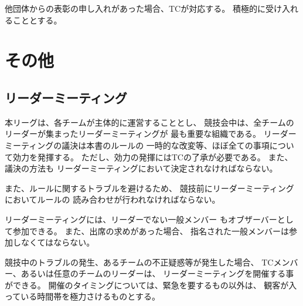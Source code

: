 \documentclass[a4j]{jarticle}
\begin{document}
他団体からの表彰の申し入れがあった場合、TCが対応する。
積極的に受け入れることとする。

\section{その他}

\subsection{リーダーミーティング}

本リーグは、各チームが主体的に運営することとし、
競技会中は、全チームのリーダーが集まったリーダーミーティングが
最も重要な組織である。
リーダーミーティングの議決は本書のルールの
一時的な改変等、ほぼ全ての事項について効力を発揮する。
ただし、効力の発揮にはTCの了承が必要である。
また、議決の方法も
リーダーミーティングにおいて決定されなければならない。

また、ルールに関するトラブルを避けるため、
競技前にリーダーミーティングにおいてルールの
読み合わせが行われなければならない。


リーダーミーティングには、リーダーでない一般メンバー
もオブザーバーとして参加できる。
また、出席の求めがあった場合、
指名された一般メンバーは参加しなくてはならない。


競技中のトラブルの発生、あるチームの不正疑惑等が発生した場合、
TCメンバー、あるいは任意のチームのリーダーは、
リーダーミーティングを開催する事ができる。
開催のタイミングについては、緊急を要するもの以外は、
観客が入っている時間帯を極力さけるものとする。


%
\end{document}
